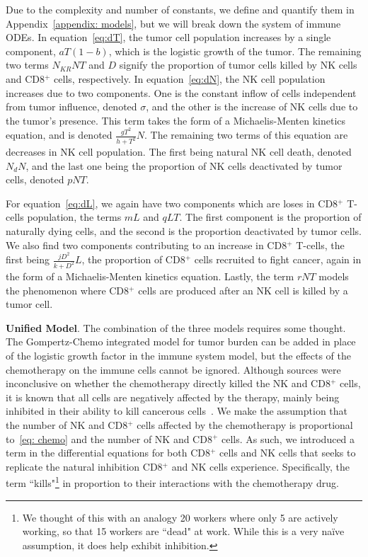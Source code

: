\documentclass[11pt]{amsart}
\begin{document}
Due to the complexity and number of constants, we define and quantify them in Appendix\ \ref{appendix: models}, but we will break down the system of immune ODEs. 
In equation\ \eqref{eq:dT}, the tumor cell population increases by a single component, $aT(1-b)$, which is the logistic growth  of the tumor. The remaining two terms $N_{KR}NT$ and $D$ signify the proportion of tumor cells killed by NK cells and CD8$^+$ cells, respectively.
In equation\ \eqref{eq:dN}, the NK cell population increases due to two components. One is the constant inflow of cells independent from tumor influence, denoted $\sigma$, and the other is the increase of NK cells due to the tumor's presence. This term takes the form of a Michaelis-Menten kinetics equation, and is denoted $\frac{gT^2}{h + T^2}N$. The remaining two terms of this equation are decreases in NK cell population. The first being natural NK cell death, denoted $N_dN$, and the last one being the proportion of NK cells deactivated by tumor cells, denoted $pNT$.

For equation\ \eqref{eq:dL}, we again have two components which are loses in CD8$^+$ T-cells population, the terms $mL$ and $qLT$. The first component is the proportion of naturally dying cells, and the second is the proportion deactivated by tumor cells. We also find two components contributing to an increase in CD8$^+$ T-cells, the first being $\frac{jD^2}{k + D^2}L$, the proportion of CD8$^+$ cells recruited to fight cancer, again in the form of a Michaelis-Menten kinetics equation. Lastly, the term $rNT$ models the phenomenon where CD8$^+$ cells are produced after an NK cell is killed by a tumor cell. 


\textbf{Unified Model}. The combination of the three models requires some thought.
The Gompertz-Chemo integrated model for tumor burden can be added in place of the logistic growth factor in the immune system model, but the effects of the chemotherapy on the immune cells cannot be ignored.
Although sources were inconclusive on whether the chemotherapy directly killed the NK and CD8$^+$ cells, it is known that all cells are negatively affected by the therapy, mainly being inhibited in their ability to kill cancerous cells\ \cite{RebeCytoChemonImmune}.
We make the assumption that the number of NK and CD8$^+$ cells affected by the chemotherapy is proportional to\ \eqref{eq: chemo} and the number of NK and CD8$^+$ cells. 
As such, we introduced a term in the differential equations for both CD8$^+$ cells and NK cells that seeks to replicate the natural inhibition CD8$^+$ and NK cells experience.
Specifically, the term ``kills"\footnote{We thought of this with an analogy 20 workers where only 5 are actively working, so that 15 workers are ``dead" at work. While this is a very naïve assumption, it does help exhibit inhibition.} in proportion to their interactions with the chemotherapy drug.
\end{document}

